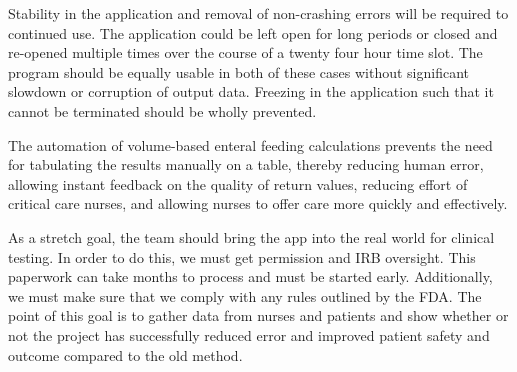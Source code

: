 \documentclass[fullpage,10pt, onecolumn, draftclsnofoot]{IEEEtran}
\begin{document}
Stability in the application and removal of non-crashing errors will be required to continued use.
The application could be left open for long periods or closed and re-opened multiple times 
over the course of a twenty four hour time slot. The program should be equally usable in both 
of these cases without significant slowdown or corruption of output data. Freezing in the application
such that it cannot be terminated should be wholly prevented.

The automation of volume-based enteral feeding calculations prevents the need for tabulating
the results manually on a table, thereby reducing human error, allowing instant feedback on
the quality of return values, reducing effort of critical care nurses, and allowing nurses to offer
care more quickly and effectively.

As a stretch goal, the team should bring the app into the real world for clinical testing. 
In order to do this, we must get permission and IRB oversight. This paperwork can take months to 
process and must be started early. Additionally, we must make sure that we comply with any rules
outlined by the FDA. The point of this goal is to gather data from nurses and patients and show 
whether or not the project has successfully reduced error and improved patient safety and outcome 
compared to the old method. 
 
\end{document}
